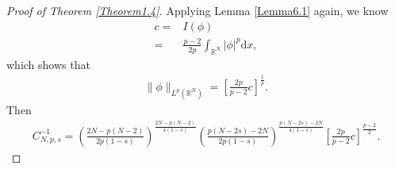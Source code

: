 \documentclass[12pt,a4paper,reqno]{amsart}
\numberwithin{equation}{section}
\begin{document}
\begin{proof}[Proof of Theorem \ref{Theorem1.4}]
Applying Lemma \ref{Lemma6.1} again, we know
\begin{equation*}
\begin{aligned}
c
=&I(\phi)\\
=&\frac{p-2}{2p}\int_{\mathbb{R}^{N}}|\phi|^{p}\mathrm{d}x,
\end{aligned}
\end{equation*}
which shows that
\begin{equation*}
\begin{aligned}
\|\phi\|_{L^{p}(\mathbb{R}^{N})}
=\left[
\frac{2p}{p-2}
c
\right]^{\frac{1}{p}}.
\end{aligned}
\end{equation*}
Then
\begin{equation*}
\begin{aligned}
C_{N,p,s}^{-1}
=\left(
\frac{2N-p(N-2)}{2p(1-s)}
\right)
^{\frac{2N-p(N-2)}{4(1-s)}}
\left(
\frac{p(N-2s)-2N}{2p(1-s)}
\right)
^{\frac{p(N-2s)-2N}{4(1-s)}}
\left[
\frac{2p}{p-2}
c
\right]^{\frac{p-2}{2}}.
\end{aligned}
\end{equation*}
\end{proof}
\end{document}
